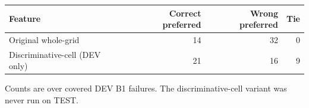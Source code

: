 \begin{table}[t]
\centering
\small
\begin{tabular}{lrrr}
\toprule
Feature & Correct preferred & Wrong preferred & Tie \\
\midrule
Original whole-grid & 14 & 32 & 0 \\
Discriminative-cell (DEV only) & 21 & 16 & 9 \\
\bottomrule
\end{tabular}
\parbox{\linewidth}{\footnotesize Counts are over \FailureCount{} covered DEV B1 failures. The discriminative-cell variant was never run on TEST.}
\end{table}
